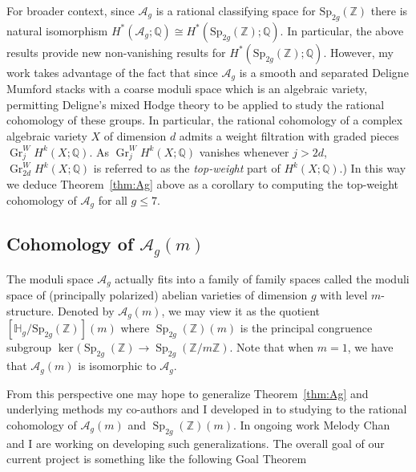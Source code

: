 \documentclass[11pt,reqno]{amsart}
\theoremstyle{remark}
\newcommand{\Gr}{\operatorname{Gr}}
\newcommand{\Sp}{\operatorname{Sp}}
\newcommand{\cA}{\mathcal{A}}
\newcommand{\cM}{\mathcal{M}}
\newcommand{\Q}{\mathbb{Q}}
\newcommand{\Z}{\mathbb{Z}}
\begin{document}
For broader context, since $\cA_g$ is a rational classifying space for $\mathrm{Sp}_{2g}(\Z)$ there is natural isomorphism $H^*(\cA_g;\Q) \cong H^*(\mathrm{Sp}_{2g}(\Z);\Q)$. In particular, the above results provide new non-vanishing results for $H^*(\mathrm{Sp}_{2g}(\Z);\Q)$. However, my work takes advantage of the fact that since $\cA_g$  is a smooth and separated Deligne Mumford stacks with a coarse moduli space which is an algebraic variety, permitting Deligne's mixed Hodge theory to be applied to study the rational cohomology of these groups. In particular, the rational cohomology of a %
complex algebraic variety $X$ of dimension $d$ admits a weight filtration with graded pieces $\Gr_{j}^W\!H^k(X;\mathbb{Q})$. %
As $\Gr_{j}^W\!H^k(X;\mathbb{Q})$ vanishes whenever $j>2d$, $\Gr_{2d}^W\!H^k(X;\mathbb{Q})$ is referred to as the {\em top-weight} part of $H^k(X;\Q)$.)  In this way we deduce Theorem~\ref{thm:Ag} above as a corollary to computing the top-weight cohomology of $\cA_{g}$ for all $g\leq 7$.  







\subsection{Cohomology of $\cA_{g}(m)$}

The moduli space $\cA_{g}$ actually fits into a family of family spaces called the moduli space of (principally polarized) abelian varieties of dimension $g$ with level $m$-structure. Denoted by $\cA_{g}(m)$, we may view it as the quotient $[\mathbb{H}_g/\mathrm{Sp}_{2g}(\Z)](m)$  where $\Sp_{2g}(\Z)(m)$ is the principal congruence subgroup $\ker(\Sp_{2g}(\Z) \to \Sp_{2g}(\Z/m\Z)$. Note that when $m=1$, we have that $\cA_{g}(m)$ is isomorphic to $\cA_{g}$. 

From this perspective one may hope to generalize Theorem~\ref{thm:Ag} and underlying methods my co-authors and I developed in \cite{BBCMMW22} to studying to the rational cohomology of  $\cA_{g}(m)$ and $\Sp_{2g}(\Z)(m)$. In ongoing work Melody Chan and I are working on developing such generalizations. The overall goal of our current project is something like the following Goal Theorem
\end{document}
